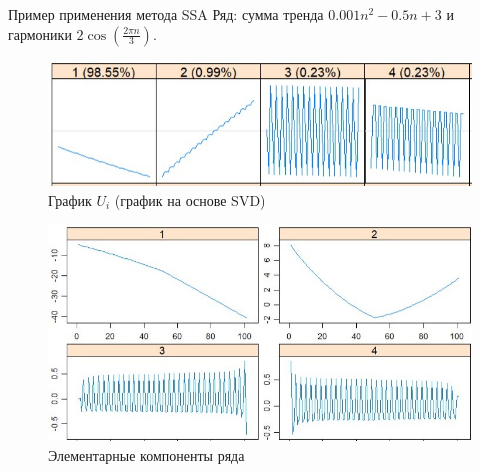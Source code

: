 \documentclass[ucs, notheorems, handout]{beamer}
\begin{document}
\begin{frame}{Пример применения метода SSA}
\small
    Ряд: сумма тренда $0.001n^2 - 0.5n + 3$ и гармоники $2 \cos(\frac{2 \pi n} {3})$.
    \pause
    \begin{figure}
  \begin{minipage}[c]{0.5\textwidth}
    \includegraphics[scale = 0.4]{ssa_example1.jpg}
  \end{minipage}\hfill
  \begin{minipage}[l]{0.5\textwidth}
    \caption{
       \footnotesize График $U_i$ (график на основе SVD)
    } \label{fig:03-03}
  \end{minipage}
\end{figure}
    \pause
    \begin{figure}
  \begin{minipage}[c]{0.5\textwidth}
    \includegraphics[scale = 0.3]{ssa_example2.jpg}
  \end{minipage}\hfill
  \begin{minipage}[l]{0.5\textwidth}
    \caption{
       Элементарные компоненты ряда
    } \label{fig:03-03}
  \end{minipage}
\end{figure}


\end{frame}
\end{document}
